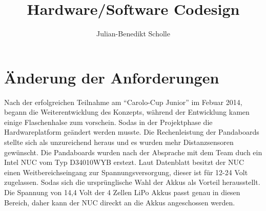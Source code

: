 \documentclass[11pt,twoside,a4paper]{mpreport}
\title{Hardware/Software Codesign}
\author{Julian-Benedikt Scholle}
\begin{document}
\maketitle
\tableofcontents










\chapter{Änderung der Anforderungen}
Nach der erfolgreichen Teilnahme am ``Carolo-Cup Junior'' im Febuar 2014, begann die Weiterentwicklung des Konzepts, während der Entwicklung kamen
einige Flaschenhalse zum vorschein. Sodas in der Projektphase die Hardwareplatform geändert werden musste. Die Rechenleistung der Pandaboards stellte sich
als unzureichend heraus und es wurden mehr Distanzsensoren gewünscht. Die Pandaboards wurden nach der Absprache mit dem Team duch ein Intel NUC vom Typ
D34010WYB erstezt. Laut Datenblatt \cite{datasheet-nuc} besitzt der NUC einen Weitbereichseingang zur Spannungsversorgung, dieser ist für 12-24 Volt zugelassen.
Sodas sich die ursprünglische Wahl der Akkus als Vorteil herausstellt. Die Spannung von 14,4 Volt der 4 Zellen LiPo Akkus passt genau in diesen Bereich, daher
kann der NUC direckt an die Akkus angeschossen werden.

















\listoffigures

{}

\end{document}
